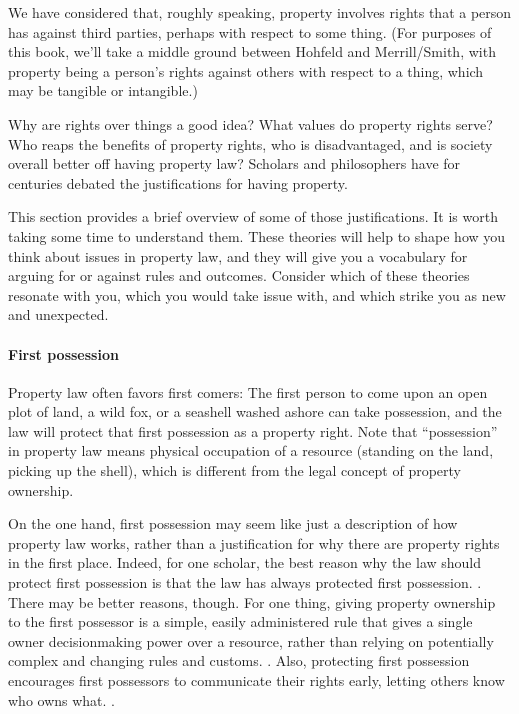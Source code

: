 
We have considered that, roughly speaking, property involves rights that a
person has against third parties, perhaps with respect to some thing. (For
purposes of this book, we'll take a middle ground between Hohfeld and
Merrill/Smith, with property being a person's rights against others with respect
to a thing, which may be tangible or intangible.)

Why are rights over things a good idea? What values do property rights serve?
Who reaps the benefits of property rights, who is disadvantaged, and is society
overall better off having property law? Scholars and philosophers have for
centuries debated the justifications for having property.

This section provides a brief overview of some of those justifications. It is
worth taking some time to understand them. These theories will help to
shape how you think about issues in property law, and they will give you a
vocabulary for arguing for or against rules and outcomes. Consider which of
these theories resonate with you, which you would take issue with, and which
strike you as new and unexpected.





\paragraph{First possession} Property law often favors first comers: The first
person to come upon an open plot of land, a wild fox, or a seashell washed
ashore can take possession, and the law will protect that first possession as a
property right. Note that ``possession'' in property law means physical
occupation of a resource (standing on the land, picking up the shell), which is
different from the legal concept of property ownership.

On the one hand, first possession may seem like just a description of how
property law works, rather than a justification for why there are property
rights in the first place. Indeed, for one scholar, the best reason why the law
should protect first possession is that the law has always protected first
possession. . There may be
better reasons, though. For one thing, giving property ownership to the first
possessor is a simple, easily administered rule that gives a single owner
decisionmaking power over a resource, rather than relying on potentially complex
and changing rules and customs. . Also, protecting first possession encourages first possessors to
communicate their rights early, letting others know who owns what. .


